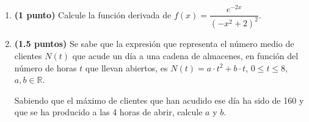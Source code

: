 
\begin{enumerate}[label=\alph*)]
\item \textbf{(1 punto)} Calcule la función derivada de $f(x)=\dfrac{e^{-2x}}{(-x^2+2)^2}$.
\item \textbf{(1.5 puntos)} Se sabe que la expresión que representa el número medio de clientes $N(t)$ que acude un día a una cadena de almacenes, en función del número de horas $t$ que llevan abiertos, es $N(t)=a\cdot t^2+b\cdot t$, $0\leq t\leq8$, $a,b\in\mathbb{R}$.

Sabiendo que el máximo de clientes que han acudido ese día ha sido de 160 y que se ha producido a las 4 horas de abrir, calcule $a$ y $b$.
\end{enumerate}
